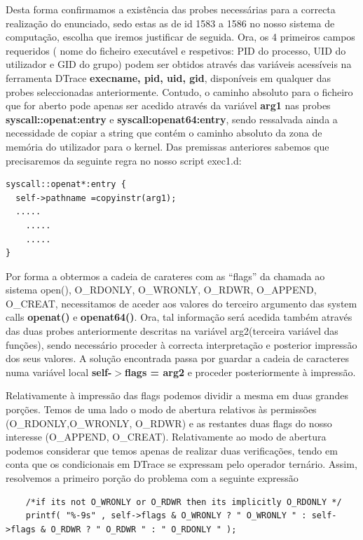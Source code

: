 \documentclass[a4paper]{article}
\begin{document}
Desta forma confirmamos a existência das probes necessárias para a correcta realização do enunciado, sedo estas as de id 1583 a 1586 no nosso sistema de computação, escolha que iremos justificar de seguida.
Ora, os 4 primeiros campos requeridos ( nome do ficheiro executável e respetivos: PID do processo, UID do utilizador e GID do grupo) podem ser obtidos através das variáveis acessíveis na ferramenta DTrace \textbf{execname, pid, uid, gid}, disponíveis em qualquer das probes seleccionadas anteriormente. Contudo, o caminho absoluto para o ficheiro que for aberto pode apenas ser acedido através da variável \textbf{arg1} nas probes  \textbf{syscall::openat:entry} e \textbf{syscall:openat64:entry}, sendo ressalvada ainda a necessidade de copiar a string que contém o caminho absoluto da zona de memória do utilizador para o kernel. Das premissas anteriores sabemos que precisaremos da seguinte regra no nosso script exec1.d:
\begin{lstlisting}
syscall::openat*:entry {
  self->pathname =copyinstr(arg1);
  .....
    .....
    .....
}
\end{lstlisting}

Por forma a obtermos a cadeia de carateres com as “flags” da chamada ao sistema open(), O\_RDONLY,
    O\_WRONLY, O\_RDWR, O\_APPEND, O\_CREAT, necessitamos de aceder aos valores do terceiro argumento das system calls \textbf{openat()} e \textbf{openat64()}.  Ora, tal informação será acedida também através das duas probes anteriormente descritas na variável arg2(terceira variável das funções), sendo necessário proceder à correcta interpretação e posterior impressão dos seus valores. A solução encontrada passa por guardar a cadeia de caracteres numa variável local \textbf{self-$>$flags = arg2} e proceder posteriormente à impressão. \par 
    Relativamente à impressão das flags podemos dividir a mesma em duas grandes porções. Temos de uma lado o modo de abertura relativos às permissões (O\_RDONLY,O\_WRONLY, O\_RDWR) e as restantes duas flags do nosso interesse (O\_APPEND, O\_CREAT). Relativamente ao modo de abertura podemos considerar que temos apenas de realizar duas verificações, tendo em conta que os condicionais em DTrace se expressam pelo operador ternário. Assim, resolvemos a primeiro porção do problema com a seguinte expressão
    \begin{lstlisting}
    /*if its not O_WRONLY or O_RDWR then its implicitly O_RDONLY */
    printf( "%-9s" , self->flags & O_WRONLY ? " O_WRONLY " : self->flags & O_RDWR ? " O_RDWR " : " O_RDONLY " ); 
    \end{lstlisting}
\end{document}
